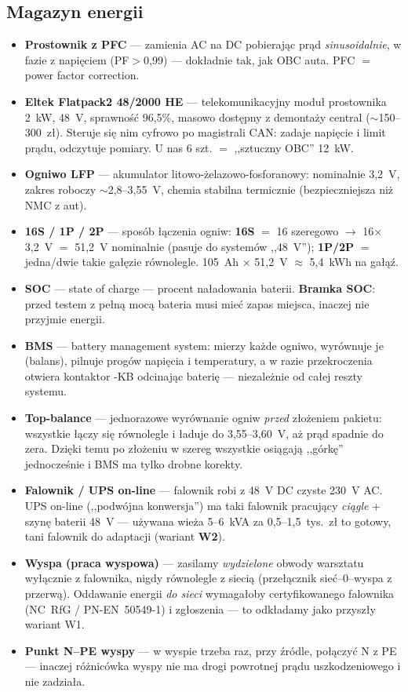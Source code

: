 \documentclass[11pt,a4paper]{article}
\newcommand{\poj}[2]{\item \textbf{#1} --- #2}
\begin{document}
\subsection{Magazyn energii}
\begin{itemize}
\poj{Prostownik z PFC}{zamienia AC na DC pobierając prąd \emph{sinusoidalnie}, w fazie z napięciem
(PF$>$0,99) --- dokładnie tak, jak OBC auta. PFC $=$ power factor correction.}
\poj{Eltek Flatpack2 48/2000 HE}{telekomunikacyjny moduł prostownika 2~kW, 48~V, sprawność 96,5\%,
masowo dostępny z demontaży central ($\sim$150--300~zł). Steruje się nim cyfrowo po magistrali CAN:
zadaje napięcie i limit prądu, odczytuje pomiary. U nas 6 szt. $=$ ,,sztuczny OBC'' 12~kW.}
\poj{Ogniwo LFP}{akumulator litowo-żelazowo-fosforanowy: nominalnie 3,2~V, zakres roboczy
$\sim$2,8--3,55~V, chemia stabilna termicznie (bezpieczniejsza niż NMC z aut).}
\poj{16S / 1P / 2P}{sposób łączenia ogniw: \textbf{16S} $=$ 16 szeregowo $\to$ 16$\times$3,2~V
$=$ 51,2~V nominalnie (pasuje do systemów ,,48~V''); \textbf{1P/2P} $=$ jedna/dwie takie gałęzie
równolegle. 105~Ah $\times$ 51,2~V $\approx$ 5,4~kWh na gałąź.}
\poj{SOC}{state of charge --- procent naładowania baterii. \textbf{Bramka SOC}: przed testem
z pełną mocą bateria musi mieć zapas miejsca, inaczej nie przyjmie energii.}
\poj{BMS}{battery management system: mierzy każde ogniwo, wyrównuje je (balans), pilnuje progów
napięcia i temperatury, a w razie przekroczenia otwiera kontaktor -KB odcinając baterię ---
niezależnie od całej reszty systemu.}
\poj{Top-balance}{jednorazowe wyrównanie ogniw \emph{przed} złożeniem pakietu: wszystkie łączy się
równolegle i ładuje do 3,55--3,60~V, aż prąd spadnie do zera. Dzięki temu po złożeniu w szereg
wszystkie osiągają ,,górkę'' jednocześnie i BMS ma tylko drobne korekty.}
\poj{Falownik / UPS on-line}{falownik robi z 48~V DC czyste 230~V AC. UPS on-line (,,podwójna
konwersja'') ma taki falownik pracujący \emph{ciągle} + szynę baterii 48~V --- używana wieża
5--6~kVA za 0,5--1,5~tys.~zł to gotowy, tani falownik do adaptacji (wariant \textbf{W2}).}
\poj{Wyspa (praca wyspowa)}{zasilamy \emph{wydzielone} obwody warsztatu wyłącznie z falownika,
nigdy równolegle z siecią (przełącznik sieć--0--wyspa z przerwą). Oddawanie energii \emph{do
sieci} wymagałoby certyfikowanego falownika (NC~RfG / PN-EN~50549-1) i zgłoszenia --- to
odkładamy jako przyszły wariant W1.}
\poj{Punkt N--PE wyspy}{w wyspie trzeba raz, przy źródle, połączyć N z PE --- inaczej różnicówka
wyspy nie ma drogi powrotnej prądu uszkodzeniowego i nie zadziała.}
\end{itemize}
\end{document}
